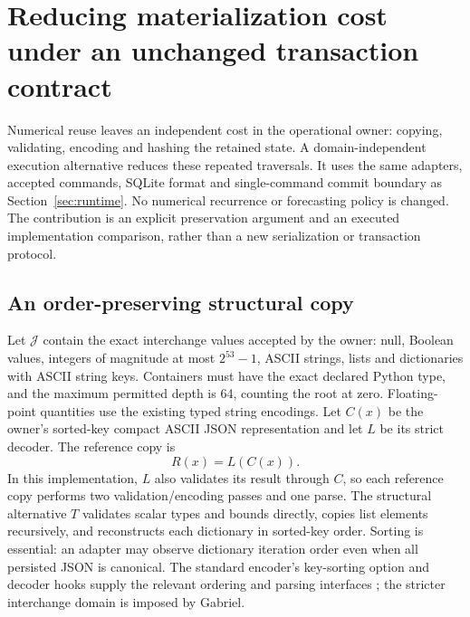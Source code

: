 \documentclass[11pt,a4paper]{article}
\theoremstyle{definition}\newtheorem{definition}[theorem]{Definition}
\begin{document}
\section{Reducing materialization cost under an unchanged transaction contract}\label{sec:fastowner}
Numerical reuse leaves an independent cost in the operational owner: copying, validating, encoding and hashing the retained state. A domain-independent execution alternative reduces these repeated traversals. It uses the same adapters, accepted commands, SQLite format and single-command commit boundary as Section~\ref{sec:runtime}. No numerical recurrence or forecasting policy is changed. The contribution is an explicit preservation argument and an executed implementation comparison, rather than a new serialization or transaction protocol.

\subsection{An order-preserving structural copy}
Let $\mathcal J$ contain the exact interchange values accepted by the owner: null, Boolean values, integers of magnitude at most $2^{53}-1$, ASCII strings, lists and dictionaries with ASCII string keys. Containers must have the exact declared Python type, and the maximum permitted depth is 64, counting the root at zero. Floating-point quantities use the existing typed string encodings. Let $C(x)$ be the owner's sorted-key compact ASCII JSON representation and let $L$ be its strict decoder. The reference copy is
\[
 R(x)=L(C(x)).
\]
In this implementation, $L$ also validates its result through $C$, so each reference copy performs two validation/encoding passes and one parse. The structural alternative $T$ validates scalar types and bounds directly, copies list elements recursively, and reconstructs each dictionary in sorted-key order. Sorting is essential: an adapter may observe dictionary iteration order even when all persisted JSON is canonical. The standard encoder's key-sorting option and decoder hooks supply the relevant ordering and parsing interfaces \cite{pythonjson312}; the stricter interchange domain is imposed by Gabriel.
\end{document}
